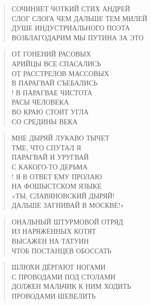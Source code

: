 \poemtitle{***}
\begin{verse}
СОЧИНЯЕТ ЧОТКИЙ СТИХ АНДРЕЙ\\
СЛОГ СЛОГА ЧЕМ ДАЛЬШЕ ТЕМ МИЛЕЙ\\
ДУШЕ ИНДУСТРИАЛЬНОГО ПОЭТА\\
ВОЗБЛАГОДАРИМ МЫ ПУТИНА ЗА ЭТО
\end{verse}

\poemtitle{***}
\begin{verse}
ОТ ГОНЕНИЙ РАСОВЫХ\\
АРИЙЦЫ ВСЕ СПАСАЛИСЬ\\
ОТ РАССТРЕЛОВ МАССОВЫХ\\
В ПАРАГВАЙ СЪЕБАЛИСЬ\\!
В ПАРАГВАЕ ЧИСТОТА \\
РАСЫ ЧЕЛОВЕКА\\
ВО КРАЮ СТОИТ УГЛА\\
СО СРЕДИНЫ ВЕКА
\end{verse}

\poemtitle{***}
\begin{verse}
МНЕ ДЫРЯЙ ЛУКАВО ТЫЧЕТ\\
ТМЕ, ЧТО СПУТАЛ Я\\
ПАРАГВАЙ И УРУГВАЙ\\
С КАКОГО-ТО ДЕРЬМА\\!
Я В ОТВЕТ ЕМУ ПРОЛАЮ\\
НА ФОШЫСТСКОМ ЯЗЫКЕ\\
«ТЫ, СЛАВЯНОВСКИЙ ДЫРЯЙ!\\
ДАЛЬШЕ ЗАГНИВАЙ В МОСКВЕ!»
\end{verse}

\poemtitle{***}
\begin{verse}
ОНАЛЬНЫЙ ШТУРМОВОЙ ОТРЯД\\
ИЗ НАРЯЖЕННЫХ КОТЯТ\\
ВЫСАЖЕН НА ТАТУИН\\
ЧТОБ ПОСТАНЦЕВ ОБОССАТЬ
\end{verse}

\poemtitle{***}
\begin{verse}
ШЛЮХИ ДЁРГАЮТ НОГАМИ\\
С ПРОВОДАМИ ПОД СТОЛАМИ\\
ДОЛЖЕН МАЛЬЧИК К НИМ ХОДИТЬ\\
ПРОВОДАМИ ШЕВЕЛИТЬ
\end{verse}

